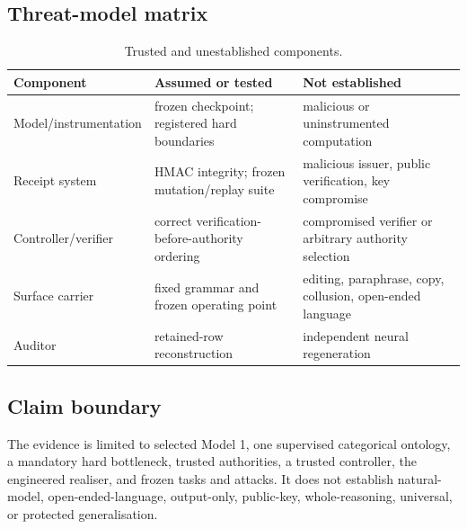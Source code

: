 \subsection{Threat-model matrix}
\begin{table}[H]
\caption{Trusted and unestablished components.}
\centering
\small
\begin{tabularx}{\linewidth}{@{}lYY@{}}
\toprule
Component & Assumed or tested & Not established \\
\midrule
Model/instrumentation & frozen checkpoint; registered hard boundaries & malicious or uninstrumented computation \\
Receipt system & HMAC integrity; frozen mutation/replay suite & malicious issuer, public verification, key compromise \\
Controller/verifier & correct verification-before-authority ordering & compromised verifier or arbitrary authority selection \\
Surface carrier & fixed grammar and frozen operating point & editing, paraphrase, copy, collusion, open-ended language \\
Auditor & retained-row reconstruction & independent neural regeneration \\
\bottomrule
\end{tabularx}
\end{table}

\subsection{Claim boundary}
The evidence is limited to selected Model 1, one supervised categorical ontology, a mandatory hard bottleneck, trusted \hmac{} authorities, a trusted controller, the engineered \rngtwo{} realiser, and frozen tasks and attacks. It does not establish natural-model, open-ended-language, output-only, public-key, whole-reasoning, universal, or protected generalisation.
